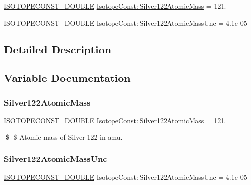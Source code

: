\begin{DoxyCompactItemize}
\item 
\mbox{\hyperlink{group___isotope_const-_macros_ga8f45a7272ce02c0b4c65c44636ed719a}{I\+S\+O\+T\+O\+P\+E\+C\+O\+N\+S\+T\+\_\+\+D\+O\+U\+B\+LE}} \mbox{\hyperlink{group___isotope_const-_silver-_ag122_ga0f29948054417a3c170ff09eb082913c}{Isotope\+Const\+::\+Silver122\+Atomic\+Mass}} = 121.
\item 
\mbox{\hyperlink{group___isotope_const-_macros_ga8f45a7272ce02c0b4c65c44636ed719a}{I\+S\+O\+T\+O\+P\+E\+C\+O\+N\+S\+T\+\_\+\+D\+O\+U\+B\+LE}} \mbox{\hyperlink{group___isotope_const-_silver-_ag122_ga47434c9e61ec13d17e86a60172eee796}{Isotope\+Const\+::\+Silver122\+Atomic\+Mass\+Unc}} = 4.\+1e-\/05
\end{DoxyCompactItemize}


\subsection{Detailed Description}


\subsection{Variable Documentation}
\mbox{\label{group___isotope_const-_silver-_ag122_ga0f29948054417a3c170ff09eb082913c}} 
\subsubsection{\texorpdfstring{Silver122\+Atomic\+Mass}{Silver122AtomicMass}}
{\footnotesize\ttfamily \mbox{\hyperlink{group___isotope_const-_macros_ga8f45a7272ce02c0b4c65c44636ed719a}{I\+S\+O\+T\+O\+P\+E\+C\+O\+N\+S\+T\+\_\+\+D\+O\+U\+B\+LE}} Isotope\+Const\+::\+Silver122\+Atomic\+Mass = 121.}

\$ \$ Atomic mass of Silver-\/122 in amu. \mbox{\label{group___isotope_const-_silver-_ag122_ga47434c9e61ec13d17e86a60172eee796}} 
\subsubsection{\texorpdfstring{Silver122\+Atomic\+Mass\+Unc}{Silver122AtomicMassUnc}}
{\footnotesize\ttfamily \mbox{\hyperlink{group___isotope_const-_macros_ga8f45a7272ce02c0b4c65c44636ed719a}{I\+S\+O\+T\+O\+P\+E\+C\+O\+N\+S\+T\+\_\+\+D\+O\+U\+B\+LE}} Isotope\+Const\+::\+Silver122\+Atomic\+Mass\+Unc = 4.\+1e-\/05}

